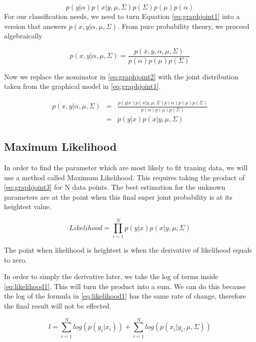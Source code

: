 \documentclass{ecctd01} %
\begin{document}
\begin{equation}
  \label{eq:graphjoint1}
  p(y|\alpha)p(x|y,\mu,\Sigma)p(\Sigma)p(\mu)p(\alpha)
\end{equation}
For our classification needs, we need to turn Equation
\eqref{eq:graphjoint1} into a version that answers
$p(x,y|\alpha,\mu,\Sigma)$. From pure probability theory, we proceed 
algebraically

\begin{equation}
  \label{eq:graphjoint2}
  p(x,y|\alpha,\mu,\Sigma) =
  \frac{p(x,y,\alpha,\mu,\Sigma)}
       {p(\alpha)p(\mu)p(\Sigma)} 
\end{equation}

Now we replace the nominator in \eqref{eq:graphjoint2} with the joint
distribution taken from the graphical model in \eqref{eq:graphjoint1}.

\begin{eqnarray}
  \label{eq:graphjoint3}
  p(x,y|\alpha,\mu,\Sigma) &=&
  \frac{p(y|x)p(x|y,\mu,\Sigma)p(\alpha)p(\mu)p(\Sigma)}
       {p(\alpha)p(\mu)p(\Sigma)} \nonumber \\
  &=& p(y|x)p(x|y,\mu,\Sigma) 
\end{eqnarray}


\subsection{Maximum Likelihood}

In order to find the parameter which are most likely to fit traning data, we
will use a method called Maximum Likelihood. This requires taking the product of
\eqref{eq:graphjoint3} for N data points. The best estimation for the unknown
parameters are at the point when this final super joint probability is at its
heightest value. 

\begin{equation}
  \label{eq:likelihood1}
Likelihood = \prod_{i=1}^N p(y|x)p(x|y,\mu,\Sigma)
\end{equation}


The point when likelihood is heightest is when the derivative of likelihood
equals to zero.


In order to simply the derivative later, we take the log of terms
inside \eqref{eq:likelihood1}. This will turn the product into a
sum. We can do this because the log of the formula in
\eqref{eq:likelihood1} has the same rate of change, therefore the
final result will not be effected.

\begin{equation}
  \label{eq:likelihood2}
  l = \sum_{i=1}^N log (p(y_{i}|x_{i})) + \sum_{i=1}^N log (p(x_{i}|y_{i},\mu,\Sigma))
\end{equation}
\end{document}
